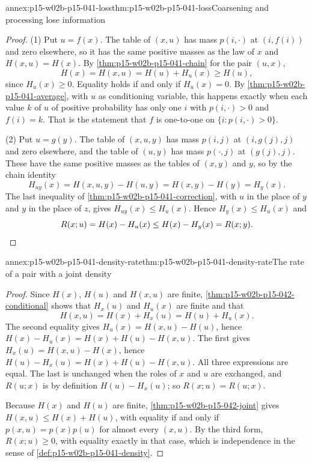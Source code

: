 \begin{annexitem}{annex:p15-w02b-p15-041-loss}{thm:p15-w02b-p15-041-loss}{Coarsening and processing lose information}
\begin{proof}
(1) Put \(u=f(x)\). The table of \((x,u)\) has mass \(p(i,\cdot)\)
at \((i,f(i))\) and zero elsewhere, so it has the same positive masses
as the law of \(x\) and \(H(x,u)=H(x)\). By
\cref{thm:p15-w02b-p15-041-chain} for the pair \((u,x)\),
\[
 H(x)=H(x,u)=H(u)+H_u(x)\geq H(u),
\]
since \(H_u(x)\geq0\). Equality holds if and only if \(H_u(x)=0\). By
\cref{thm:p15-w02b-p15-041-average}, with \(u\) as conditioning
variable, this happens exactly when each value \(k\) of \(u\) of
positive probability has only one \(i\) with \(p(i,\cdot)>0\) and
\(f(i)=k\). That is the statement that \(f\) is one-to-one on
\(\{i:p(i,\cdot)>0\}\).

(2) Put \(u=g(y)\). The table of \((x,u,y)\) has mass \(p(i,j)\) at
\((i,g(j),j)\) and zero elsewhere, and the table of \((u,y)\) has mass
\(p(\cdot,j)\) at \((g(j),j)\). These have the same positive masses as
the tables of \((x,y)\) and \(y\), so by the chain identity
\[
 H_{uy}(x)=H(x,u,y)-H(u,y)=H(x,y)-H(y)=H_y(x).
\]
The last inequality of \cref{thm:p15-w02b-p15-041-correction}, with
\(u\) in the place of \(y\) and \(y\) in the place of \(z\), gives
\(H_{uy}(x)\leq H_u(x)\). Hence \(H_y(x)\leq H_u(x)\) and
\[
 R(x;u)=H(x)-H_u(x)\leq H(x)-H_y(x)=R(x;y).\qedhere
\]
\end{proof}
\end{annexitem}

\begin{annexitem}{annex:p15-w02b-p15-041-density-rate}{thm:p15-w02b-p15-041-density-rate}{The rate of a pair with a joint density}
\begin{proof}
Since \(H(x)\), \(H(u)\) and \(H(x,u)\) are finite,
\cref{thm:p15-w02b-p15-042-conditional} shows that \(H_x(u)\) and
\(H_u(x)\) are finite and that
\[
 H(x,u)=H(x)+H_x(u)=H(u)+H_u(x).
\]
The second equality gives \(H_u(x)=H(x,u)-H(u)\), hence
\(H(x)-H_u(x)=H(x)+H(u)-H(x,u)\). The first gives
\(H_x(u)=H(x,u)-H(x)\), hence \(H(u)-H_x(u)=H(x)+H(u)-H(x,u)\). All
three expressions are equal. The last is unchanged when the roles of
\(x\) and \(u\) are exchanged, and \(R(u;x)\) is by definition
\(H(u)-H_x(u)\); so \(R(x;u)=R(u;x)\).

Because \(H(x)\) and \(H(u)\) are finite,
\cref{thm:p15-w02b-p15-042-joint} gives \(H(x,u)\leq H(x)+H(u)\), with
equality if and only if \(p(x,u)=p(x)p(u)\) for almost every \((x,u)\).
By the third form, \(R(x;u)\geq0\), with equality exactly in that case,
which is independence in the sense of
\cref{def:p15-w02b-p15-041-density}.
\end{proof}
\end{annexitem}

